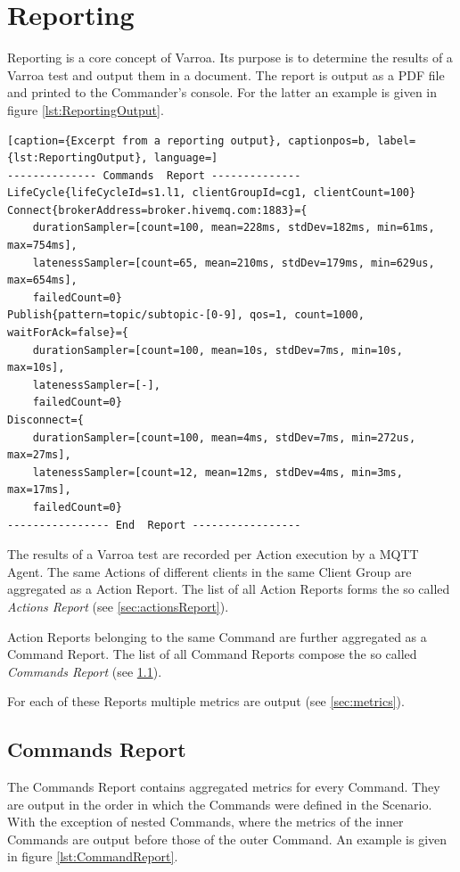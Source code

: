 \chapter{Reporting}\label{sec:Reporting}
Reporting is a core concept of Varroa.
Its purpose is to determine the results of a Varroa test and output them in a document.
The report is output as a PDF file and printed to the Commander's console.
For the latter an example is given in figure \ref{lst:ReportingOutput}.
\\
\begin{lstlisting}[caption={Excerpt from a reporting output}, captionpos=b, label={lst:ReportingOutput}, language=]
-------------- Commands  Report --------------
LifeCycle{lifeCycleId=s1.l1, clientGroupId=cg1, clientCount=100}
Connect{brokerAddress=broker.hivemq.com:1883}={
	durationSampler=[count=100, mean=228ms, stdDev=182ms, min=61ms, max=754ms],
	latenessSampler=[count=65, mean=210ms, stdDev=179ms, min=629us, max=654ms],
	failedCount=0}
Publish{pattern=topic/subtopic-[0-9], qos=1, count=1000, waitForAck=false}={
	durationSampler=[count=100, mean=10s, stdDev=7ms, min=10s, max=10s],
	latenessSampler=[-],
	failedCount=0}
Disconnect={
	durationSampler=[count=100, mean=4ms, stdDev=7ms, min=272us, max=27ms],
	latenessSampler=[count=12, mean=12ms, stdDev=4ms, min=3ms, max=17ms],
	failedCount=0}
---------------- End  Report -----------------
\end{lstlisting}
The results of a Varroa test are recorded per Action execution by a MQTT Agent.
The same Actions of different clients in the same Client Group are aggregated as a Action Report.
The list of all Action Reports forms the so called \emph{Actions Report} (see \ref{sec:actionsReport}).

Action Reports belonging to the same Command are further aggregated as a Command Report.
The list of all Command Reports compose the so called \emph{Commands Report} (see \ref{sec:commandsReport}).

For each of these Reports multiple metrics are output (see \ref{sec:metrics}).

\section{Commands Report}
\label{sec:commandsReport}
The Commands Report contains aggregated metrics for every Command.
They are output in the order in which the Commands were defined in the Scenario.
With the exception of nested Commands, where the metrics of the inner Commands are output before those of the outer Command.
An example is given in figure \ref{lst:CommandReport}.

